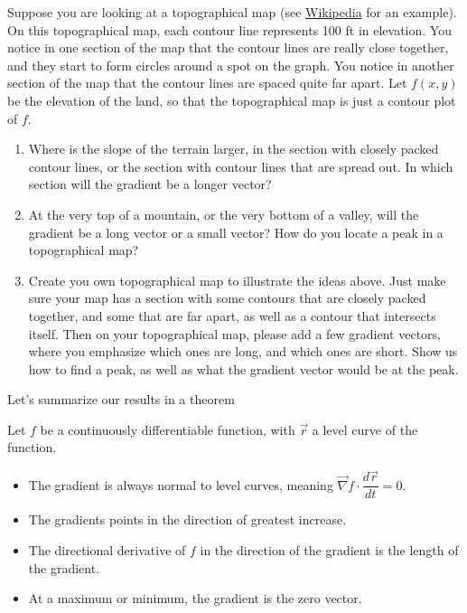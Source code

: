 \begin{problem}
 Suppose you are looking at a topographical map (see \href{http://en.wikipedia.org/wiki/Topographic_map}{Wikipedia} for an example).  On this topographical map, each contour line represents 100 ft in elevation. You notice in one section of the map that the contour lines are really close together, and they start to form circles around a spot on the graph. You notice in another section of the map that the contour lines are spaced quite far apart. Let $f(x,y)$ be the elevation of the land, so that the topographical map is just a contour plot of $f$.  
\begin{enumerate}
 \item Where is the slope of the terrain larger, in the section with closely packed contour lines, or the section with contour lines that are spread out. In which section will the gradient be a longer vector?
 \item At the very top of a mountain, or the very bottom of a valley, will the gradient be a long vector or a small vector? How do you locate a peak in a topographical map?
 \item {}%
Create you own topographical map to illustrate the ideas above. Just make sure your map has a section with some contours that are closely packed together, and some that are far apart, as well as a contour that intersects itself. Then on your topographical map, please add a few gradient vectors, where you emphasize which ones are long, and which ones are short. Show us how to find a peak, as well as what the gradient vector would be at the peak.  
\end{enumerate}
\end{problem}

Let's summarize our results in a theorem
\begin{theorem}
 Let $f$ be a continuously differentiable function, with $\vec r$ a level curve of the function.
\begin{itemize}
 \item The gradient is always normal to level curves, meaning $\vec \nabla f\cdot \dfrac{d\vec r}{dt}=0$.
 \item The gradients points in the direction of greatest increase.
 \item The directional derivative of $f$ in the direction of the gradient is the length of the gradient.
 \item At a maximum or minimum, the gradient is the zero vector. 
\end{itemize}
\end{theorem}


